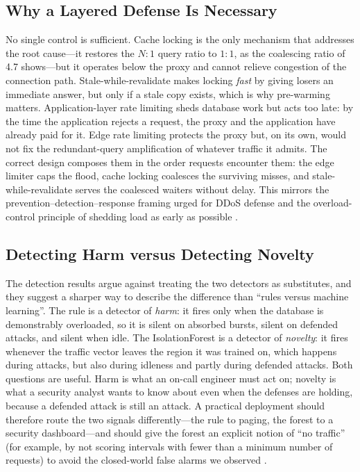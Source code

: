 \documentclass[preprint,12pt]{elsarticle}
\begin{document}
\subsection{Why a Layered Defense Is Necessary}
No single control is sufficient. Cache locking is the only mechanism that addresses the
root cause---it restores the $N{:}1$ query ratio to $1{:}1$, as the coalescing ratio of
4.7 shows---but it operates below the proxy and cannot relieve congestion of the
connection path. Stale-while-revalidate makes locking \emph{fast} by giving losers an
immediate answer, but only if a stale copy exists, which is why pre-warming matters.
Application-layer rate limiting sheds database work but acts too late: by the time the
application rejects a request, the proxy and the application have already paid for
it. Edge rate limiting protects the proxy but, on its own, would not fix the
redundant-query amplification of whatever traffic it admits. The correct design
composes them in the order requests encounter them: the edge limiter caps the flood,
cache locking coalesces the surviving misses, and stale-while-revalidate serves the
coalesced waiters without delay. This mirrors the prevention--detection--response
framing urged for DDoS defense \cite{zargar2013} and the overload-control principle of
shedding load as early as possible \cite{welsh2001,beyer2016}.

\subsection{Detecting Harm versus Detecting Novelty}
The detection results argue against treating the two detectors as substitutes, and
they suggest a sharper way to describe the difference than ``rules versus machine
learning''. The rule is a detector of \emph{harm}: it fires only when the database is
demonstrably overloaded, so it is silent on absorbed bursts, silent on defended
attacks, and silent when idle. The IsolationForest is a detector of \emph{novelty}: it
fires whenever the traffic vector leaves the region it was trained on, which happens
during attacks, but also during idleness and partly during defended attacks. Both
questions are useful. Harm is what an on-call engineer must act on; novelty is what a
security analyst wants to know about even when the defenses are holding, because a
defended attack is still an attack. A practical deployment should therefore route the
two signals differently---the rule to paging, the forest to a security dashboard---and
should give the forest an explicit notion of ``no traffic'' (for example, by not
scoring intervals with fewer than a minimum number of requests) to avoid the
closed-world false alarms we observed \cite{sommer2010}.
\end{document}
